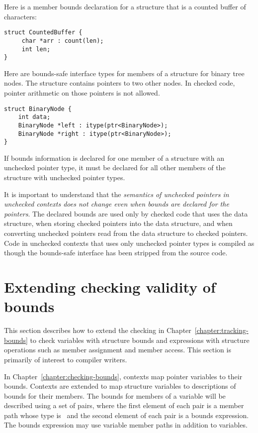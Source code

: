 Here is a member bounds declaration for a structure that is a counted buffer
of characters:

\begin{lstlisting}
struct CountedBuffer {
     char *arr : count(len);
     int len;
}
\end{lstlisting}

Here are bounds-safe interface types for members of a structure for binary
tree nodes. The structure contains pointers to two other nodes.  In
checked code, pointer arithmetic on those pointers is not allowed.

\begin{lstlisting}
struct BinaryNode {
    int data;
    BinaryNode *left : itype(ptr<BinaryNode>);
    BinaryNode *right : itype(ptr<BinaryNode>);
}
\end{lstlisting}

If bounds information is declared for one member of a structure with an
unchecked pointer type, it must be declared for all other members of the
structure with unchecked pointer types.

It is important to understand that the \emph{semantics of unchecked
pointers in unchecked contexts does not change even when bounds are declared 
for the pointers}. The declared bounds are used only by checked code that uses the
data structure, when storing checked pointers into the data structure, and when converting
unchecked pointers read from the data structure to checked pointers.  Code in unchecked
contexts that uses only unchecked pointer types is compiled as though the bounds-safe
interface has been stripped from the source code.

\section{Extending checking validity of bounds}
\label{section:checking-bounds-with-structures}

This section describes how to extend the checking in Chapter~\ref{chapter:tracking-bounds} 
to check variables with structure bounds and expressions with structure operations such 
as member assignment and member access.  This section is primarily of interest to compiler writers.

In Chapter~\ref{chapter:checking-bounds}, contexts map pointer variables to their bounds.
Contexts are extended to map structure variables to descriptions of bounds for their
members.  The bounds for members of a variable will be described using a set of pairs,
where the first element of each pair is a member path whose type is \arrayptr\
and the second element of each pair is a bounds expression.  The bounds expression may use 
variable member paths in addition to variables.


